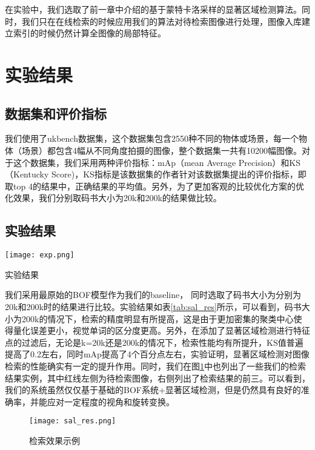 在实验中，我们选取了前一章中介绍的基于蒙特卡洛采样的显著区域检测算法。同时，我们只在在线检索的时候应用我们的算法对待检索图像进行处理，图像入库建立索引的时候仍然计算全图像的局部特征。

\section{实验结果}
\subsection{数据集和评价指标}
我们使用了ukbench数据集\cite{nister2006scalable}，这个数据集包含2550种不同的物体或场景，每一个物体（场景）都包含4幅从不同角度拍摄的图像，整个数据集一共有10200幅图像。对于这个数据集，我们采用两种评价指标：mAp（mean Average Precision）和KS（Kentucky Score)，KS指标是该数据集的作者针对该数据集提出的评价指标，即取top 4的结果中，正确结果的平均值。另外，为了更加客观的比较优化方案的优化效果，我们分别取码书大小为20k和200k的结果做比较。

\subsection{实验结果}
\begin{table}[h]
\centering
\texttt{[image: exp.png]}
\caption{实验结果}\label{tab:sal_res}
\end{table}

我们采用最原始的BOF模型作为我们的baseline， 同时选取了码书大小为分别为20k和200k时的结果进行比较。实验结果如表\ref{tab:sal_res}所示，可以看到，码书大小为200k的情况下，检索的精度明显有所提高，这是由于更加密集的聚类中心使得量化误差更小，视觉单词的区分度更高。另外，在添加了显著区域检测进行特征点的过滤后，无论是k=20k还是200k的情况下，检索性能均有所提升，KS值普遍提高了0.2左右，同时mAp提高了4个百分点左右，实验证明，显著区域检测对图像检索的性能确实有一定的提升作用。同时，我们在图\ref{fig:sal_res}中也列出了一些我们的检索结果实例，其中红线左侧为待检索图像，右侧列出了检索结果的前三。可以看到，我们的系统虽然仅仅基于基础的BOF系统+显著区域检测，但是仍然具有良好的准确率，并能应对一定程度的视角和旋转变换。

\begin{figure}[h]
\centering
\texttt{[image: sal\_res.png]}
\caption{检索效果示例}\label{fig:sal_res}
\end{figure}
